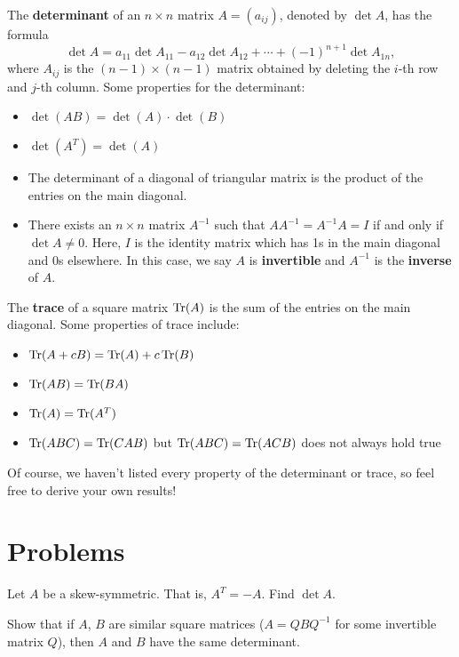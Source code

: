 \documentclass{article}
\begin{document}
The \textbf{determinant} of an $n \times n$ matrix $A = (a_{ij})$, denoted by $\det A$, has the formula 
\[\det A = a_{11} \det A_{11} - a_{12} \det A_{12} + \cdots + (-1)^{n + 1} \det A_{1n}, 
\]
where $A_{ij}$ is the $(n - 1) \times (n - 1)$ matrix obtained by deleting the $i$-th row and $j$-th column. Some properties for the determinant: 
\begin{itemize}
    \item $\det(AB) = \det(A) \cdot \det(B)$ 
    \item $\det(A^{T}) = \det(A)$
    \item The determinant of a diagonal of triangular matrix is the product of the entries on the main diagonal.
    \item There exists an \(n\times n\) matrix \(A^{-1}\) such that \(AA^{-1}=A^{-1}A=I\) if and only if \(\det A\neq 0\).
    Here, \(I\) is the identity matrix which has 1s in the main diagonal and 0s elsewhere.
    In this case, we say \(A\) is \textbf{invertible} and \(A^{-1}\) is the \textbf{inverse} of \(A\).
\end{itemize}

The \textbf{trace} of a square matrix \(\operatorname{Tr}(A)\) is the sum of the entries on the main diagonal.
Some properties of trace include:
\begin{itemize}
    \item $\operatorname{Tr}(A + cB) = \operatorname{Tr}(A) + c\operatorname{Tr}(B)$
    \item $\operatorname{Tr}(AB) = \operatorname{Tr}(BA)$
    \item $\operatorname{Tr}(A) = \operatorname{Tr}(A^{T})$
    \item $\operatorname{Tr}(ABC) = \operatorname{Tr}(CAB)$ but $\operatorname{Tr}(ABC) = \operatorname{Tr}(ACB)$ does not always hold true
\end{itemize}
Of course, we haven't listed every property of the determinant or trace, so feel free to derive your own results!

\section{Problems}

\begin{exercise}
    Let \(A\) be a skew-symmetric.
    That is, \(A^T=-A\).
    Find \(\det A\).
\end{exercise}

\begin{exercise}
            Show that if $A$, $B$ are similar square matrices ($A = QBQ^{-1}$ for some invertible matrix $Q$), then $A$ and $B$ have the same determinant.   
        \end{exercise}
\end{document}
